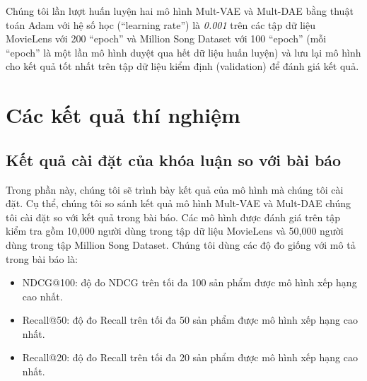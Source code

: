 Chúng tôi lần lượt huấn luyện hai mô hình Mult-VAE và Mult-DAE bằng thuật toán Adam \cite{Goodfellow-et-al-2016-Book} với hệ số học (``learning rate'') là \textit{0.001} trên các tập dữ liệu MovieLens \cite{Ml20M} với 200 ``epoch'' và Million Song Dataset \cite{MSD} với 100 ``epoch'' (mỗi ``epoch'' là một lần mô hình duyệt qua hết dữ liệu huấn luyện) và lưu lại mô hình cho kết quả tốt nhất trên tập dữ liệu kiểm định (validation) để đánh giá kết quả. 


\section{Các kết quả thí nghiệm}
    \subsection{Kết quả cài đặt của khóa luận so với bài báo}
    \label{experiment1}
    Trong phần này, chúng tôi sẽ trình bày kết quả của mô hình mà chúng tôi cài đặt. 
    Cụ thể, chúng tôi so sánh kết quả mô hình Mult-VAE và Mult-DAE chúng tôi cài đặt so với kết quả trong bài báo.
    Các mô hình được đánh giá trên tập kiểm tra gồm 10,000 người dùng trong tập dữ liệu MovieLens và 50,000 người dùng trong tập Million Song Dataset.
    Chúng tôi dùng các độ đo giống với mô tả trong bài báo là:
    \begin{itemize}
        \item NDCG@100: độ đo NDCG trên tối đa 100 sản phẩm được mô hình xếp hạng cao nhất.
        \item Recall@50: độ đo Recall trên tối đa 50 sản phẩm được mô hình xếp hạng cao nhất.
        \item Recall@20: độ đo Recall trên tối đa 20 sản phẩm được mô hình xếp hạng cao nhất.
    \end{itemize}

